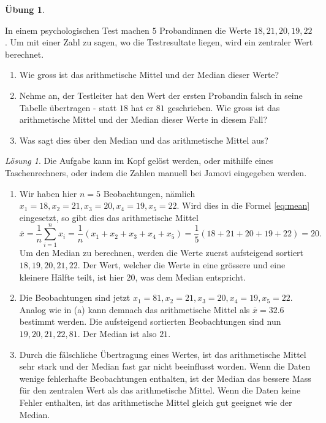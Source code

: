 \documentclass[
]{book}
\providecommand{\tightlist}{%
  \setlength{\itemsep}{0pt}\setlength{\parskip}{0pt}}
\theoremstyle{definition}
\theoremstyle{definition}
\theoremstyle{definition}
\newtheorem{exercise}{Übung}[chapter]
\theoremstyle{definition}
\theoremstyle{remark}
\newtheorem*{solution}{Lösung}
\begin{document}
\begin{exercise}
\protect\hypertarget{exr:theorie-mdn-mean}{}\label{exr:theorie-mdn-mean}

In einem psychologischen Test machen \(5\) Probandinnen die Werte \(18, 21, 20, 19, 22\). Um mit einer Zahl zu sagen, wo die Testresultate liegen, wird ein zentraler Wert berechnet.

\begin{enumerate}
\def\labelenumi{(\alph{enumi})}
\tightlist
\item
  Wie gross ist das arithmetische Mittel und der Median dieser Werte?
\item
  Nehme an, der Testleiter hat den Wert der ersten Probandin falsch in seine Tabelle übertragen - statt \(18\) hat er \(81\) geschrieben. Wie gross ist das arithmetische Mittel und der Median dieser Werte in diesem Fall?
\item
  Was sagt dies über den Median und das arithmetische Mittel aus?
\end{enumerate}

\end{exercise}

\begin{solution}

Die Aufgabe kann im Kopf gelöst werden, oder mithilfe eines Taschenrechners, oder indem die Zahlen manuell bei Jamovi eingegeben werden.

\begin{enumerate}
\def\labelenumi{(\alph{enumi})}
\tightlist
\item
  Wir haben hier \(n=5\) Beobachtungen, nämlich \(x_1 = 18, x_2 = 21, x_3 = 20, x_4 = 19, x_5=22\). Wird dies in die Formel \eqref{eq:mean} eingesetzt, so gibt dies das arithmetische Mittel
  \[\bar{x} = \frac{1}{n}\sum^n_{i=1} x_i = \frac{1}{n}(x_1 + x_2 + x_3 + x_4 + x_5) =  \frac{1}{5}(18+ 21+ 20+ 19+ 22) = 20.\]
  Um den Median zu berechnen, werden die Werte zuerst aufsteigend sortiert \(18, 19, 20, 21, 22\). Der Wert, welcher die Werte in eine grössere und eine kleinere Hälfte teilt, ist hier \(20\), was dem Median entspricht.
\item
  Die Beobachtungen sind jetzt \(x_1 = 81, x_2 = 21, x_3 = 20, x_4 = 19, x_5=22\). Analog wie in (a) kann demnach das arithmetische Mittel als \(\bar{x} = 32.6\) bestimmt werden. Die aufsteigend sortierten Beobachtungen sind nun \(19, 20, 21, 22, 81\). Der Median ist also \(21\).
\item
  Durch die fälschliche Übertragung eines Wertes, ist das arithmetische Mittel sehr stark und der Median fast gar nicht beeinflusst worden. Wenn die Daten wenige fehlerhafte Beobachtungen enthalten, ist der Median das bessere Mass für den zentralen Wert als das arithmetische Mittel. Wenn die Daten keine Fehler enthalten, ist das arithmetische Mittel gleich gut geeignet wie der Median.
\end{enumerate}

\end{solution}
\end{document}
